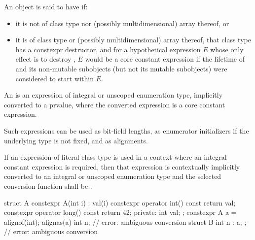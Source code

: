 \pnum
An object  is said to have  if:
\begin{itemize}
\item
  it is not of class type nor (possibly multidimensional) array thereof, or
\item
  it is of class type or (possibly multidimensional) array thereof,
  that class type has a constexpr destructor, and
  for a hypothetical expression $E$
  whose only effect is to destroy ,
  $E$ would be a core constant expression
  if the lifetime of  and its non-mutable subobjects
  (but not its mutable subobjects) were considered to start within $E$.
\end{itemize}

\pnum
An 
is an expression of integral or
unscoped enumeration type, implicitly converted to a prvalue, where the converted expression is a core constant expression.
\begin{note}
Such expressions can be
used as bit-field lengths, as enumerator
initializers if the underlying type is not fixed,
and as alignments.
\end{note}

\pnum
If an expression of literal class type is used in a context where an
integral constant expression is required, then that expression is
contextually implicitly converted to an integral or unscoped
enumeration type
and the selected conversion function shall be .
\begin{example}
\begin{codeblock}
struct A {
  constexpr A(int i) : val(i) { }
  constexpr operator int() const { return val; }
  constexpr operator long() const { return 42; }
private:
  int val;
};
constexpr A a = alignof(int);
alignas(a) int n;               // error: ambiguous conversion
struct B { int n : a; };        // error: ambiguous conversion
\end{codeblock}
\end{example}

